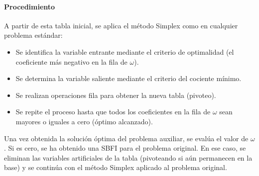 \paragraph{Procedimiento}

A partir de esta tabla inicial, se aplica el método Simplex como en cualquier problema estándar:

\begin{itemize}
  \item Se identifica la variable entrante mediante el criterio de optimalidad (el coeficiente más negativo en la fila de \(\omega\)).
  \item Se determina la variable saliente mediante el criterio del cociente mínimo.
  \item Se realizan operaciones fila para obtener la nueva tabla (pivoteo).
  \item Se repite el proceso hasta que todos los coeficientes en la fila de \(\omega\) sean mayores o iguales a cero (óptimo alcanzado).
\end{itemize}

Una vez obtenida la solución óptima del problema auxiliar, se evalúa el valor de \(\omega\). Si es cero, se ha obtenido una SBFI para el problema original. En ese caso, se eliminan las variables artificiales de la tabla (pivoteando si aún permanecen en la base) y se continúa con el método Simplex aplicado al problema original.